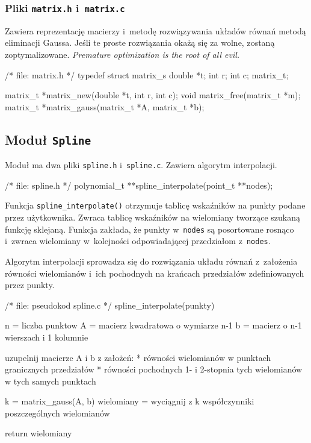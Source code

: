 \documentclass[12pt,a4paper]{article}
\newcommand{\p}[1]{\texttt{#1}}
\begin{document}
\subsubsection{Pliki \p{matrix.h} i~\p{matrix.c}}
Zawiera reprezentację macierzy i~metodę rozwiązywania układów równań metodą
eliminacji Gaussa. Jeśli te proste rozwiązania okażą się za wolne, zostaną
zoptymalizowane. \emph{Premature optimization is the root of all evil.}
\begin{SmallVerbatim}
    /* file: matrix.h */
    typedef struct matrix_s {
      double *t;
      int r;
      int c;
    } matrix_t;
    
    matrix_t *matrix_new(double *t, int r, int c);
    void matrix_free(matrix_t *m);
    matrix_t *matrix_gauss(matrix_t *A, matrix_t *b);
\end{SmallVerbatim}

\subsection{Moduł \p{Spline}}

Moduł ma dwa pliki \p{spline.h} i~\p{spline.c}. Zawiera algorytm interpolacji.
\begin{SmallVerbatim}
    /* file: spline.h */
    polynomial_t **spline_interpolate(point_t **nodes);
\end{SmallVerbatim}
Funkcja \p{spline\_interpolate()} otrzymuje tablicę wskaźników na punkty podane
przez użytkownika. Zwraca tablicę wskaźników na wielomiany tworzące szukaną
funkcję sklejaną. Funkcja zakłada, że punkty w~\p{nodes} są posortowane
rosnąco i~zwraca wielomiany w~kolejności odpowiadającej przedziałom
z~\p{nodes}.

Algorytm interpolacji sprowadza się do rozwiązania układu równań z~założenia
równości wielomianów i~ich pochodnych na krańcach przedziałów zdefiniowanych
przez punkty.
\begin{SmallVerbatim}
    /* file: pseudokod spline.c */
    spline_interpolate(punkty)
    {
      n = liczba punktow
      A = macierz kwadratowa o wymiarze n-1
      b = macierz o n-1 wierszach i 1 kolumnie
      
      uzupelnij macierze A i b z założeń:
      * równości wielomianów w punktach granicznych przedziałów
      * równości pochodnych 1- i 2-stopnia tych wielomianów w tych samych punktach
      
      k = matrix_gauss(A, b)
      wielomiany = wyciągnij z k współczynniki poszczególnych wielomianów
      
      return wielomiany
    }
\end{SmallVerbatim}
\end{document}
